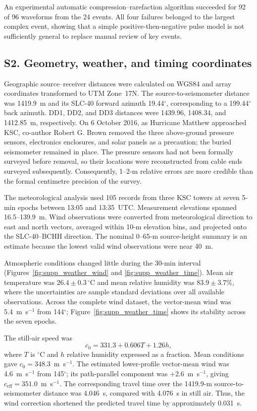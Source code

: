 \documentclass[]{seismica}
\begin{document}
An experimental automatic compression--rarefaction algorithm succeeded for
92 of 96 waveforms from the 24 events. All four failures belonged to the
largest complex event, showing that a simple positive-then-negative pulse model
is not sufficiently general to replace manual review of key events.

\FloatBarrier
\subsection{S2. Geometry, weather, and timing coordinates}
\label{sec:supp_weather}

Geographic source--receiver distances were calculated on WGS84 and array
coordinates transformed to UTM Zone~17N. The source-to-seismometer distance
was 1419.9~m and its SLC-40 forward azimuth 19.44$^\circ$, corresponding to a
199.44$^\circ$ back azimuth. DD1, DD2, and DD3 distances were 1439.96,
1408.34, and 1412.85~m, respectively. On 6 October 2016, as Hurricane Matthew approached
KSC, co-author Robert G. Brown removed the three above-ground pressure sensors,
electronics enclosures, and solar panels as a precaution; the buried
seismometer remained in place. The pressure sensors had not been formally
surveyed before removal, so their locations were reconstructed from cable ends
surveyed subsequently. Consequently, 1--2-m relative errors are more credible
than the formal centimetre precision of the survey.

The meteorological analysis used 105 records from three KSC towers at seven
5-min epochs between 13:05 and 13:35~UTC. Measurement elevations spanned
16.5--139.9~m. Wind observations were converted from meteorological direction
to east and north vectors, averaged within 10-m elevation bins, and projected
onto the SLC-40--BCHH direction. The nominal 0--65-m source-height summary is
an estimate because the lowest valid wind observations were near 40~m.

Atmospheric conditions changed little during the 30-min interval
(Figures~\ref{fig:supp_weather_wind} and
\ref{fig:supp_weather_time}). Mean air temperature was
$26.4\pm0.3\,^{\circ}$C and mean relative humidity was
$83.9\pm3.7\%$, where the uncertainties are sample standard deviations over
all available observations. Across the complete wind dataset, the vector-mean
wind was 5.4~m~s$^{-1}$ from 144$^\circ$; Figure~\ref{fig:supp_weather_time}
shows its stability across the seven epochs.

The still-air speed was
\begin{equation}
 c_0=331.3+0.606T+1.26h,
\end{equation}
where $T$ is $^\circ$C and $h$ relative humidity expressed as a fraction. Mean
conditions gave $c_0=348.3$~m~s$^{-1}$. The estimated lower-profile
vector-mean wind was 4.6~m~s$^{-1}$ from 145$^\circ$; its path-parallel
component was +2.6~m~s$^{-1}$, giving
$c_{\mathrm{eff}}=351.0$~m~s$^{-1}$. The corresponding travel time over
the 1419.9-m source-to-seismometer distance was 4.046~s, compared with 4.076~s in still air. Thus, the wind
correction shortened the predicted travel time by approximately 0.031~s.
\end{document}
